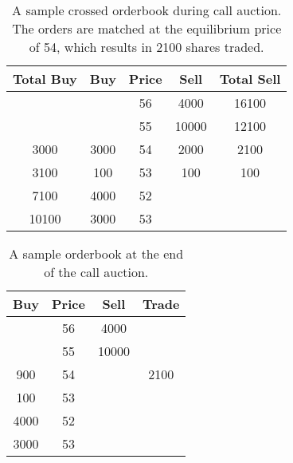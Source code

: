 \documentclass{article}
\begin{document}
\begin{table}[]\label{itayoseTable1}
  \centering
  \begin{tabular}{c|c|c|c|c}
    \hline
    \textbf{Total Buy} & \textbf{Buy} & \textbf{Price} & \textbf{Sell} & \textbf{Total Sell} \\ \hline
                       &              & 56             & 4000          & 16100               \\ \hline
                       &              & 55             & 10000         & 12100               \\ \hline
    3000               & 3000         & 54             & 2000          & 2100                \\ \hline
    3100               & 100          & 53             & 100           & 100                 \\ \hline
    7100               & 4000         & 52             &               &                     \\ \hline
    10100              & 3000         & 53             &               &                     \\ \hline
  \end{tabular}

  \caption{A sample crossed orderbook during call auction. The orders are matched at the equilibrium price of 54, which results in 2100 shares traded.}
\end{table}


\begin{table}[]\label{itayoseTable2}
  \centering
  \begin{tabular}{c|c|c|c}
    \hline
    \textbf{Buy} & \textbf{Price} & \textbf{Sell} & \textbf{Trade} \\ \hline
                 & 56             & 4000          &                \\ \hline
                 & 55             & 10000         &                \\ \hline
    900          & 54             &               & 2100           \\ \hline
    100          & 53             &               &                \\ \hline
    4000         & 52             &               &                \\ \hline
    3000         & 53             &               &                \\ \hline
  \end{tabular}
  \caption{A sample orderbook at the end of the call auction.}
\end{table}
\end{document}
